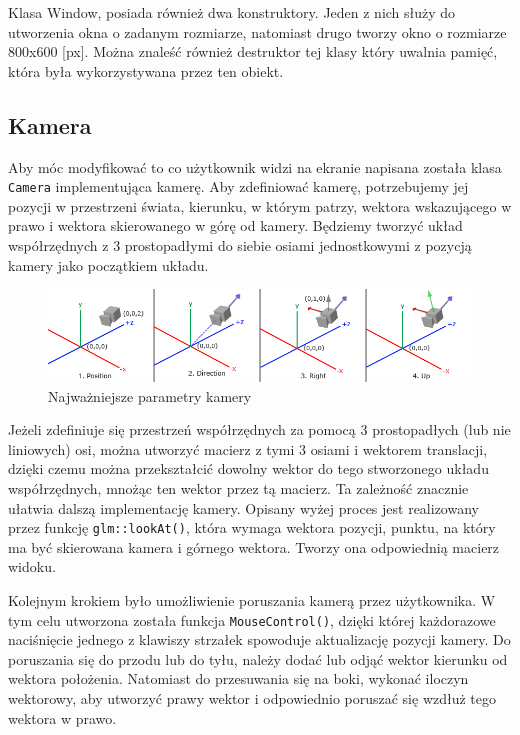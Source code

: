 \documentclass[a4paper,12pt]{article}
\numberwithin{equation}{section}
\begin{document}
Klasa Window, posiada również dwa konstruktory. Jeden z nich służy do utworzenia okna o zadanym rozmiarze, natomiast drugo tworzy okno o rozmiarze 800x600 [px]. Można znaleść również destruktor tej klasy który uwalnia pamięć, która była wykorzystywana przez ten obiekt. 



\subsection{Kamera}
Aby móc modyfikować to co użytkownik widzi na ekranie napisana została klasa \texttt{Camera} implementująca kamerę. Aby zdefiniować kamerę, potrzebujemy jej pozycji w przestrzeni świata, kierunku, w którym patrzy, wektora wskazującego w prawo i wektora skierowanego w górę od kamery. Będziemy tworzyć układ współrzędnych z 3 prostopadłymi do siebie osiami jednostkowymi z pozycją kamery jako początkiem układu.

\begin{figure}[H]
    \centering
    \includegraphics[width=\textwidth]{camera_axes.png}
    \caption{Najważniejsze parametry kamery}
    \label{fig:camera}
\end{figure}

Jeżeli zdefiniuje się przestrzeń współrzędnych za pomocą 3 prostopadłych (lub nie liniowych) osi, można utworzyć macierz z tymi 3 osiami i wektorem translacji, dzięki czemu można przekształcić dowolny wektor do tego stworzonego układu współrzędnych, mnożąc ten wektor przez tą macierz. Ta zależność znacznie ułatwia dalszą implementację kamery. Opisany wyżej proces jest realizowany przez funkcję \texttt{glm::lookAt()}, która wymaga wektora pozycji, punktu, na który ma być skierowana kamera i górnego wektora. Tworzy ona odpowiednią macierz widoku.

Kolejnym krokiem było umożliwienie poruszania kamerą przez użytkownika. W tym celu utworzona została funkcja \texttt{MouseControl()}, dzięki której każdorazowe naciśnięcie jednego z klawiszy strzałek spowoduje aktualizację pozycji kamery. Do poruszania się do przodu lub do tyłu, należy dodać lub odjąć wektor kierunku od wektora położenia. Natomiast do przesuwania się na boki, wykonać iloczyn wektorowy, aby utworzyć prawy wektor i odpowiednio poruszać się wzdłuż tego wektora w prawo.
\end{document}
